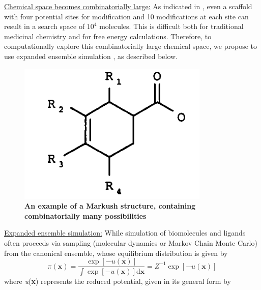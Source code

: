 \documentclass[12pt]{article}
\begin{document}
\underline{Chemical space becomes combinatorially large:} As indicated in , even a scaffold with four potential sites for modification and 10 modifications at each site can result in a search space of $10^4$ molecules. This is difficult both for traditional medicinal chemistry and for free energy calculations. Therefore, to computationally explore this combinatorially large chemical space, we propose to use expanded ensemble simulation \cite{lyubartsev1992}, as described below. 
\begin{figure}[H]
\centering
\includegraphics[scale=0.4]{mark.png}
\caption{\textbf{An example of a Markush structure, containing combinatorially many possibilities} \cite{mark}}
\label{markfig}
\end{figure}
\underline{Expanded ensemble simulation:} While simulation of biomolecules and ligands often proceeds via sampling (molecular dynamics or Markov Chain Monte Carlo) from the canonical ensemble, whose equilibrium distribution is given by \begin{equation} \pi(\textbf{x})=\frac{\exp[-u(\textbf{x})]}{\int \exp[-u(\textbf{x})] \mathrm{d}\textbf{x}}=Z^{-1}\exp[-u(\textbf{x})]\end{equation}
where \textit{u}(\textbf{x}) represents the reduced potential, given in its general form by
\end{document}
